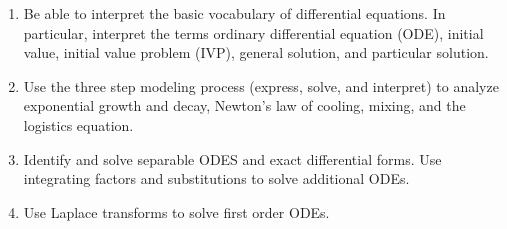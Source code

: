 
\begin{enumerate}
\item Be able to interpret the basic vocabulary of differential equations. In particular, interpret the terms ordinary differential equation (ODE), initial value, initial value problem (IVP), general solution, and particular solution.
\item Use the three step modeling process (express, solve, and interpret) to analyze exponential growth and decay, Newton's law of cooling, mixing, and the logistics equation. 
\item Identify and solve separable ODES and exact differential forms. Use integrating factors and substitutions to solve additional ODEs.
\item Use Laplace transforms to solve first order ODEs.
\end{enumerate}

